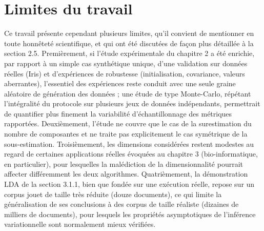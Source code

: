 \section*{Limites du travail}
Ce travail présente cependant plusieurs limites, qu'il convient de mentionner en toute honnêteté scientifique, et qui ont été discutées de façon plus détaillée à la section 2.5. Premièrement, si l'étude expérimentale du chapitre 2 a été enrichie, par rapport à un simple cas synthétique unique, d'une validation sur données réelles (Iris) et d'expériences de robustesse (initialisation, covariance, valeurs aberrantes), l'essentiel des expériences reste conduit avec une seule graine aléatoire de génération des données ; une étude de type Monte-Carlo, répétant l'intégralité du protocole sur plusieurs jeux de données indépendants, permettrait de quantifier plus finement la variabilité d'échantillonnage des métriques rapportées. Deuxièmement, l'étude ne couvre que le cas de la surestimation du nombre de composantes et ne traite pas explicitement le cas symétrique de la sous-estimation. Troisièmement, les dimensions considérées restent modestes au regard de certaines applications réelles évoquées au chapitre 3 (bio-informatique, en particulier), pour lesquelles la malédiction de la dimensionnalité pourrait affecter différemment les deux algorithmes. Quatrièmement, la démonstration LDA de la section 3.1.1, bien que fondée sur une exécution réelle, repose sur un corpus jouet de taille très réduite (douze documents), ce qui limite la généralisation de ses conclusions à des corpus de taille réaliste (dizaines de milliers de documents), pour lesquels les propriétés asymptotiques de l'inférence variationnelle sont normalement mieux vérifiées.

